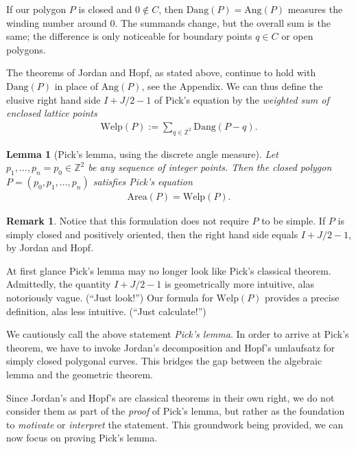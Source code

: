 \documentclass[a4paper]{amsart}
\numberwithin{equation}{section}
\theoremstyle{plain}
\newtheorem{lemma}[theorem]{Lemma}
\theoremstyle{definition}
\newtheorem{remark}[theorem]{Remark}
\newcommand{\Z}{\mathbb{Z}}
\newcommand{\Area}{\mathrm{Area}}
\newcommand{\Ang}{\mathrm{Ang}}
\newcommand{\Dang}{\mathrm{Dang}}
\newcommand{\Welp}{\mathrm{Welp}}
\begin{document}
If our polygon $P$ is closed and $0 \notin C$,
then $\Dang(P) = \Ang(P)$ measures the winding number around $0$.
The summands change, but the overall sum is the same;
the difference is only noticeable for boundary points $q \in C$ or open polygons.

The theorems of Jordan and Hopf, as stated above, continue
to hold with $\Dang(P)$ in place of $\Ang(P)$, see the Appendix.
We can thus define the elusive right hand side $I + J/2 - 1$ of Pick's equation
by the \emph{weighted sum of enclosed lattice points}
\begin{align}
  \label{eq:Welp}
  \Welp(P) := \sum_{q \in \Z^2} \Dang(P-q) .
\end{align}

\begin{lemma}[Pick's lemma, using the discrete angle measure] \label{lem:PickDiscrete}
  Let $p_1,\ldots,p_n=p_0 \in \Z^2$ be any sequence of integer points.
  Then the closed polygon $P = (p_0,p_1,\ldots,p_n)$ satisfies Pick's equation 
  \begin{align}
    \Area(P) = \Welp(P) .
  \end{align}
\end{lemma}

\begin{remark}
  Notice that this formulation does not require $P$ to be simple.
  If $P$ is simply closed and positively oriented, 
  then the right hand side equals $I + J/2 - 1$,
  by Jordan and Hopf.

  At first glance Pick's lemma may no longer look like Pick's classical theorem.
  Admittedly, the quantity $I + J/2 - 1$ is geometrically more intuitive,
  alas notoriously vague. (“Just look!”)
  Our formula for $\Welp(P)$ provides a precise definition,
  alas less intuitive. (“Just calculate!”)
  
  We cautiously call the above statement \emph{Pick's lemma}.
  In order to arrive at Pick's theorem,
  we have to invoke Jordan's decomposition and Hopf's umlaufsatz
  for simply closed polygonal curves.
  This bridges the gap between the algebraic lemma
  and the geometric theorem.

  Since Jordan's and Hopf's are classical theorems in their own right,
  we do not consider them as part of the \emph{proof} of Pick's lemma,
  but rather as the foundation to \emph{motivate} or \emph{interpret} the statement.
  This groundwork being provided, we can now focus on proving Pick's lemma.
\end{remark}
\end{document}
